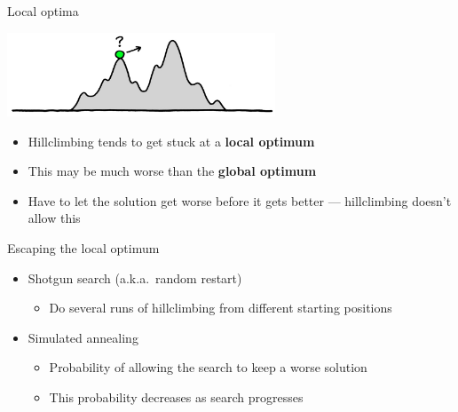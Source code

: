 \begin{frame}{Local optima}
	\pause
	\begin{center}
		\includegraphics[width=0.6\textwidth]{local_optimum}
	\end{center}
	\begin{itemize}
		\pause\item Hillclimbing tends to get stuck at a \textbf{local optimum}
		\pause\item This may be much worse than the \textbf{global optimum}
		\pause\item Have to let the solution get worse before it gets better ---
			hillclimbing doesn't allow this
	\end{itemize}
\end{frame}

\begin{frame}{Escaping the local optimum}
	\begin{itemize}
		\pause\item Shotgun search (a.k.a.\ random restart)
			\begin{itemize}
				\pause\item Do several runs of hillclimbing from different starting positions
			\end{itemize}
		\pause\item Simulated annealing
			\begin{itemize}
				\pause\item Probability of allowing the search to keep a worse solution
				\pause\item This probability decreases as search progresses
			\end{itemize}
	\end{itemize}
\end{frame}
